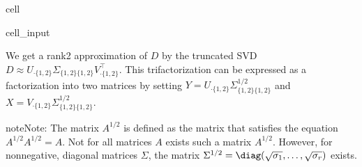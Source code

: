 \documentclass[letterpaper,10pt,english]{jupyterBook}
\begin{document}
\begin{sphinxuseclass}{cell}\begin{sphinxVerbatimInput}

\begin{sphinxuseclass}{cell_input}
\begin{sphinxVerbatim}[commandchars=\\\{\}]
    
\end{sphinxVerbatim}

\end{sphinxuseclass}\end{sphinxVerbatimInput}

\end{sphinxuseclass}
\sphinxAtStartPar
We get a rank\sphinxhyphen{}2 approximation of \(D\) by the truncated SVD \(D\approx U_{\cdot \{1,2\}}\Sigma_{\{1,2\}\{1,2\}}V_{\cdot \{1,2\}}^\top\). This tri\sphinxhyphen{}factorization can be expressed as a factorization into two matrices by setting \(Y=U_{\cdot \{1,2\}}\Sigma_{\{1,2\}\{1,2\}}^{1/2}\) and \(X=V_{\cdot \{1,2\}}\Sigma_{\{1,2\}\{1,2\}}^{1/2}\).

\begin{sphinxadmonition}{note}{Note:}
\sphinxAtStartPar
The matrix \(A^{1/2}\) is defined as the matrix that satisfies the equation \(A^{1/2}A^{1/2}=A\). Not for all matrices \(A\) exists such a matrix \(A^{1/2}\). However, for nonnegative, diagonal matrices \(\Sigma\), the matrix \(\Sigma^{1/2}=\diag(\sqrt{\sigma_1},\ldots, \sqrt{\sigma_r})\) exists.
\end{sphinxadmonition}
\end{document}

